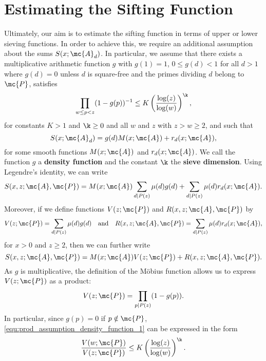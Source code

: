   \section{Estimating the Sifting Function}
    Ultimately, our aim is to estimate the sifting function in terms of upper or lower sieving functions. In order to achieve this, we require an additional assumption about the sums $S(x;\mc{A}_{d})$. In particular, we assume that there exists a multiplicative arithmetic function $g$ with $g(1) = 1$, $0 \le g(d) < 1$ for all $d > 1$ where $g(d) = 0$ unless $d$ is square-free and the primes dividing $d$ belong to $\mc{P}$, satisfies
    \begin{equation}\label{equ:prod_assumption_density_function_1}
      \prod_{w \le p < z}(1-g(p))^{-1} \le K\left(\frac{\log(z)}{\log(w)}\right)^{\k},
    \end{equation}
    for constants $K > 1$ and $\k \ge 0$ and all $w$ and $z$ with $z > w \ge 2$, and such that  
    \begin{equation}\label{equ:d_multiple_sifting_function}
      S(x;\mc{A}_{d}) = g(d)M(x;\mc{A})+r_{d}(x;\mc{A}),
    \end{equation}
    for some smooth functions $M(x;\mc{A})$ and $r_{d}(x;\mc{A})$. We call the function $g$ a \textbf{density function} and the constant $\k$ the \textbf{sieve dimension}. Using Legendre's identity, we can write
    \[
      S(x,z;\mc{A},\mc{P}) = M(x;\mc{A})\sum_{d \mid P(z)}\mu(d)g(d)+\sum_{d \mid P(z)}\mu(d)r_{d}(x;\mc{A}).
    \]
    Moreover, if we define functions $V(z;\mc{P})$ and $R(x,z;\mc{A},\mc{P})$ by
    \[
      V(z;\mc{P}) = \sum_{d \mid P(z)}\mu(d)g(d) \quad \text{and} \quad R(x,z;\mc{A},\mc{P}) = \sum_{d \mid P(z)}\mu(d)r_{d}(x;\mc{A}),
    \]
    for $x > 0$ and $z \ge 2$, then we can further write
    \[
      S(x,z;\mc{A},\mc{P}) = M(x;\mc{A})V(z;\mc{P})+R(x,z;\mc{A},\mc{P}).
    \]
    As $g$ is multiplicative, the definition of the M\"obius function allows us to express $V(z;\mc{P})$ as a product:
    \begin{equation}\label{equ:V_product_formula}
      V(z;\mc{P}) = \prod_{p \mid P(z)}(1-g(p)).
    \end{equation}
    In particular, since $g(p) = 0$ if $p \notin \mc{P}$, \cref{equ:prod_assumption_density_function_1} can be expressed in the form
    \begin{equation}\label{equ:prod_assumption_density_function_2}
      \frac{V(w;\mc{P})}{V(z;\mc{P})} \le K\left(\frac{\log(z)}{\log(w)}\right)^{\k}.
    \end{equation}
